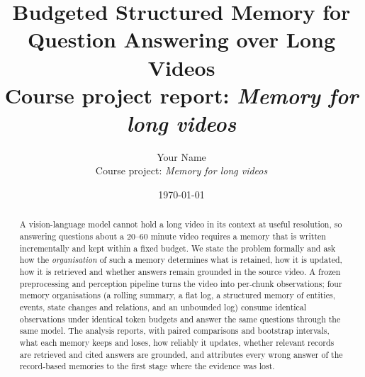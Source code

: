 \documentclass[11pt,a4paper]{article}
\title{Budgeted Structured Memory for Question Answering over Long Videos\\[0.4em]
\large Course project report: \emph{Memory for long videos}}
\author{Your Name\\\small Course project: \emph{Memory for long videos}}
\date{\today}
\theoremstyle{definition}
\begin{document}
\maketitle

\begin{abstract}
A vision-language model cannot hold a long video in its context at useful
resolution, so answering questions about a 20--60 minute video requires a
memory that is written incrementally and kept within a fixed budget. We state
the problem formally and ask how the \emph{organisation} of such a memory
determines what is retained, how it is updated, how it is retrieved and
whether answers remain grounded in the source video. A frozen preprocessing
and perception pipeline turns the video into per-chunk observations; four
memory organisations (a rolling summary, a flat log, a structured memory of
entities, events, state changes and relations, and an unbounded log) consume
identical observations under identical token budgets and answer the same
questions through the same model. The analysis reports, with paired
comparisons and bootstrap intervals, what each memory keeps and loses, how
reliably it updates, whether relevant records are retrieved and cited answers
are grounded, and attributes every wrong answer of the record-based memories
to the first stage where the evidence was lost.
\end{abstract}

\tableofcontents
\bigskip


















\appendix

\end{document}

